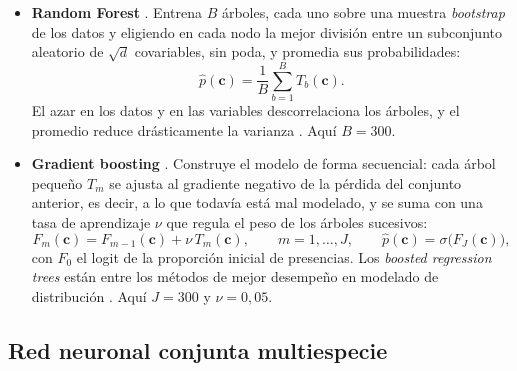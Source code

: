 \begin{itemize}[leftmargin=*, itemsep=2pt]
  \item \textbf{Random Forest} \citep{breiman2001rf}. Entrena $B$ árboles,
        cada uno sobre una muestra \textit{bootstrap} de los datos y eligiendo
        en cada nodo la mejor división entre un subconjunto aleatorio de
        $\sqrt{d}$ covariables, sin poda, y promedia sus probabilidades:
        \begin{equation}
          \hat{p}(\mathbf{c}) = \frac{1}{B} \sum_{b=1}^{B} T_b(\mathbf{c}).
          \label{eq:rf}
        \end{equation}
        El azar en los datos y en las variables descorrelaciona los árboles,
        y el promedio reduce drásticamente la varianza
        \citep[p.~278]{bishop2024deep}. Aquí $B = 300$.
  \item \textbf{Gradient boosting} \citep{friedman2001gbm}. Construye el
        modelo de forma secuencial: cada árbol pequeño $T_m$ se ajusta al
        gradiente negativo de la pérdida del conjunto anterior, es decir, a lo
        que todavía está mal modelado, y se suma con una tasa de aprendizaje
        $\nu$ que regula el peso de los árboles sucesivos:
        \begin{equation}
          F_m(\mathbf{c}) = F_{m-1}(\mathbf{c}) + \nu\, T_m(\mathbf{c}),
          \qquad m = 1, \dots, J, \qquad
          \hat{p}(\mathbf{c}) = \sigma\big(F_J(\mathbf{c})\big),
          \label{eq:gbm}
        \end{equation}
        con $F_0$ el logit de la proporción inicial de presencias. Los
        \textit{boosted regression trees} están entre los métodos de
        mejor desempeño en modelado de distribución \citep{elith2008brt,
        valavi2022benchmark}. Aquí $J = 300$ y $\nu = 0{,}05$.
\end{itemize}


\subsection{Red neuronal conjunta multiespecie}

